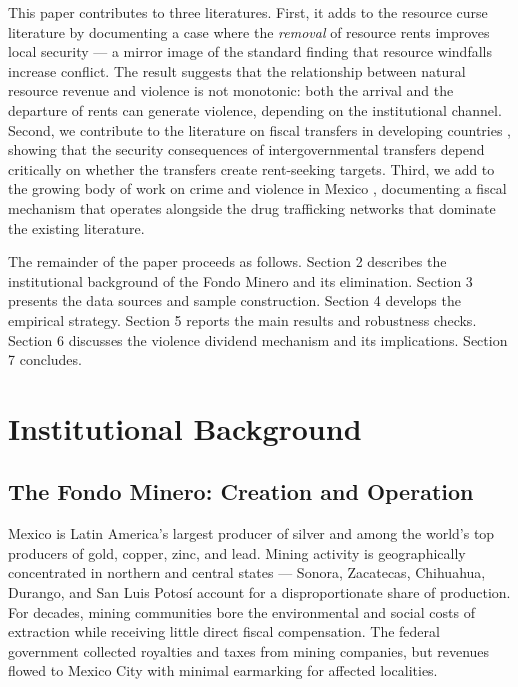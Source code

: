 \documentclass[12pt]{article}
\begin{document}
This paper contributes to three literatures. First, it adds to the resource curse literature \citep{berman2017mine, dube2013commodity, mehlum2006institutions} by documenting a case where the \textit{removal} of resource rents improves local security --- a mirror image of the standard finding that resource windfalls increase conflict. The result suggests that the relationship between natural resource revenue and violence is not monotonic: both the arrival and the departure of rents can generate violence, depending on the institutional channel. Second, we contribute to the literature on fiscal transfers in developing countries \citep{brollo2011corruption, martinez2019sources, litschig2012effect, delvalle2023fiscal}, showing that the security consequences of intergovernmental transfers depend critically on whether the transfers create rent-seeking targets. Third, we add to the growing body of work on crime and violence in Mexico \citep{dell2015trafficking, castilloberdejo2020organized}, documenting a fiscal mechanism that operates alongside the drug trafficking networks that dominate the existing literature.

The remainder of the paper proceeds as follows. Section 2 describes the institutional background of the Fondo Minero and its elimination. Section 3 presents the data sources and sample construction. Section 4 develops the empirical strategy. Section 5 reports the main results and robustness checks. Section 6 discusses the violence dividend mechanism and its implications. Section 7 concludes.


\section{Institutional Background}

\subsection{The Fondo Minero: Creation and Operation}

Mexico is Latin America's largest producer of silver and among the world's top producers of gold, copper, zinc, and lead. Mining activity is geographically concentrated in northern and central states --- Sonora, Zacatecas, Chihuahua, Durango, and San Luis Potos\'{i} account for a disproportionate share of production. For decades, mining communities bore the environmental and social costs of extraction while receiving little direct fiscal compensation. The federal government collected royalties and taxes from mining companies, but revenues flowed to Mexico City with minimal earmarking for affected localities.
\end{document}
